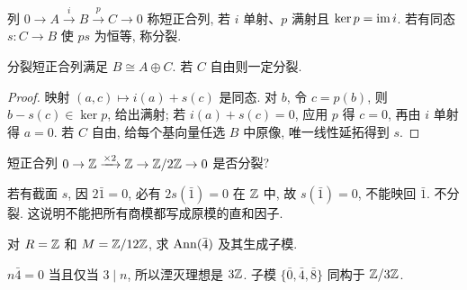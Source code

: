 \begin{definition}
列 $0\to A\xrightarrow{i}B\xrightarrow{p}C\to0$ 称短正合列, 若 $i$ 单射、$p$ 满射且 $\ker p=\operatorname{im} i$. 若有同态 $s:C\to B$ 使 $ps$ 为恒等, 称分裂.
\end{definition}
\begin{proposition}
分裂短正合列满足 $B\cong A\oplus C$. 若 $C$ 自由则一定分裂.
\end{proposition}
\begin{proof}
映射 $(a,c)\mapsto i(a)+s(c)$ 是同态. 对 $b$, 令 $c=p(b)$, 则 $b-s(c)\in\ker p$, 给出满射; 若 $i(a)+s(c)=0$, 应用 $p$ 得 $c=0$, 再由 $i$ 单射得 $a=0$. 若 $C$ 自由, 给每个基向量任选 $B$ 中原像, 唯一线性延拓得到 $s$.
\end{proof}
\begin{exercise}短正合列 $0\to\mathbb Z\xrightarrow{\times2}\mathbb Z\to\mathbb Z/2\mathbb Z\to0$ 是否分裂?\end{exercise}
\begin{solution}
若有截面 $s$, 因 $2\bar1=0$, 必有 $2s(\bar1)=0$ 在 $\mathbb Z$ 中, 故 $s(\bar1)=0$, 不能映回 $\bar1$. 不分裂. 这说明不能把所有商模都写成原模的直和因子.
\end{solution}
\begin{exercise}对 $R=\mathbb Z$ 和 $M=\mathbb Z/12\mathbb Z$, 求 $\operatorname{Ann}(\bar4)$ 及其生成子模.\end{exercise}
\begin{solution}
$n\bar4=0$ 当且仅当 $3\mid n$, 所以湮灭理想是 $3\mathbb Z$. 子模 $\{\bar0,\bar4,\bar8\}$ 同构于 $\mathbb Z/3\mathbb Z$.
\end{solution}
